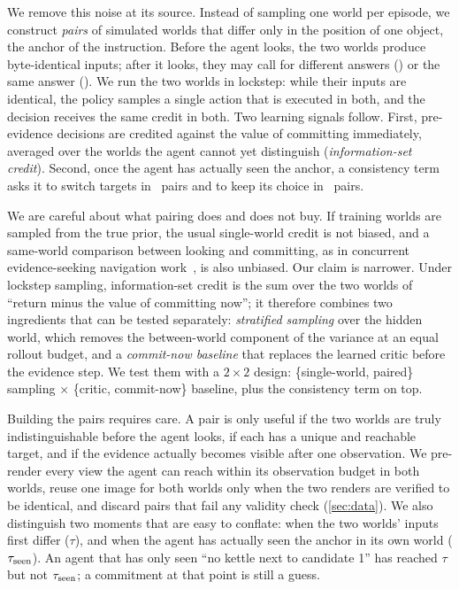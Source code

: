 We remove this noise at its source.
Instead of sampling one world per episode, we construct \emph{pairs} of simulated worlds that differ only in the position of one object, the anchor of the instruction.
Before the agent looks, the two worlds produce byte-identical inputs; after it looks, they may call for different answers (\Flip) or the same answer (\Stay).
We run the two worlds in lockstep: while their inputs are identical, the policy samples a single action that is executed in both, and the decision receives the same credit in both.
Two learning signals follow.
First, pre-evidence decisions are credited against the value of committing immediately, averaged over the worlds the agent cannot yet distinguish (\emph{information-set credit}).
Second, once the agent has actually seen the anchor, a consistency term asks it to switch targets in \Flip\ pairs and to keep its choice in \Stay\ pairs.

We are careful about what pairing does and does not buy.
If training worlds are sampled from the true prior, the usual single-world credit is not biased, and a same-world comparison between looking and committing, as in concurrent evidence-seeking navigation work~\cite{seekvln2026}, is also unbiased.
Our claim is narrower.
Under lockstep sampling, information-set credit is the sum over the two worlds of ``return minus the value of committing now''; it therefore combines two ingredients that can be tested separately: \emph{stratified sampling} over the hidden world, which removes the between-world component of the variance at an equal rollout budget, and a \emph{commit-now baseline} that replaces the learned critic before the evidence step.
We test them with a $2{\times}2$ design: \{single-world, paired\} sampling $\times$ \{critic, commit-now\} baseline, plus the consistency term on top.

Building the pairs requires care.
A pair is only useful if the two worlds are truly indistinguishable before the agent looks, if each has a unique and reachable target, and if the evidence actually becomes visible after one observation.
We pre-render every view the agent can reach within its observation budget in both worlds, reuse one image for both worlds only when the two renders are verified to be identical, and discard pairs that fail any validity check (\cref{sec:data}).
We also distinguish two moments that are easy to conflate: when the two worlds' inputs first differ ($\tau$), and when the agent has actually seen the anchor in its own world ($\tau_{\mathrm{seen}}$).
An agent that has only seen ``no kettle next to candidate 1'' has reached $\tau$ but not $\tau_{\mathrm{seen}}$; a commitment at that point is still a guess.

